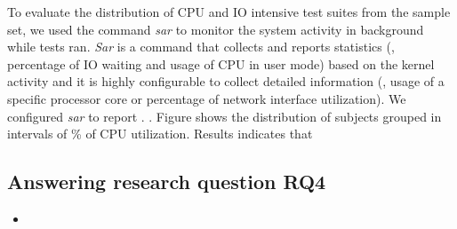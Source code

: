 To evaluate the distribution of CPU and IO intensive test suites from
the sample set, we used the command \emph{sar} to monitor the system
activity in background while tests ran. \emph{Sar} is a command that
collects and reports statistics (\eg, percentage of IO waiting and
usage of CPU in user mode) based on the kernel activity and it is
highly configurable to collect detailed information (\eg, usage of a
specific processor core or percentage of network interface
utilization). We configured \emph{sar} to report . .
Figure  shows the distribution of subjects grouped in intervals
of \% of CPU utilization. Results indicates that 


\subsection{Answering research question RQ4}
\label{sec:rqfour}

\begin{itemize}
    \item \RQD
\end{itemize}


